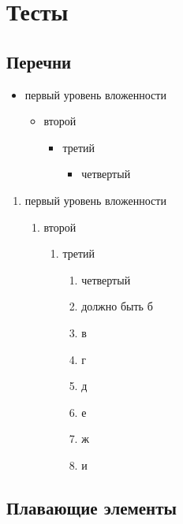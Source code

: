 \documentclass[14pt, a4paper, titlepage]{extarticle}
\renewcommand{\thesection}{\Asbuk{section}}
\let\oldsec\section
\renewcommand{\section}{\addtocounter{section}{1}\oldsec[\appendixname~\thesection]}
\begin{document}
\section{Тесты}

\subsection{Перечни}
 
\begin{itemize}
    \item первый уровень вложенности
    \begin{itemize}
        \item второй
        \begin{itemize}
            \item третий
            \begin{itemize}
                \item четвертый
            \end{itemize}
        \end{itemize}
    \end{itemize}
\end{itemize}
 
\begin{enumerate}
    \item первый уровень вложенности
    \begin{enumerate}
        \item второй
        \begin{enumerate}
            \item третий
            \begin{enumerate}
                \item четвертый
                \item должно быть б
                \item в
                \item г
                \item д
                \item е
                \item ж
                \item и
            \end{enumerate}
        \end{enumerate}
    \end{enumerate}
\end{enumerate}

\subsection{Плавающие элементы}
 
\end{document}
